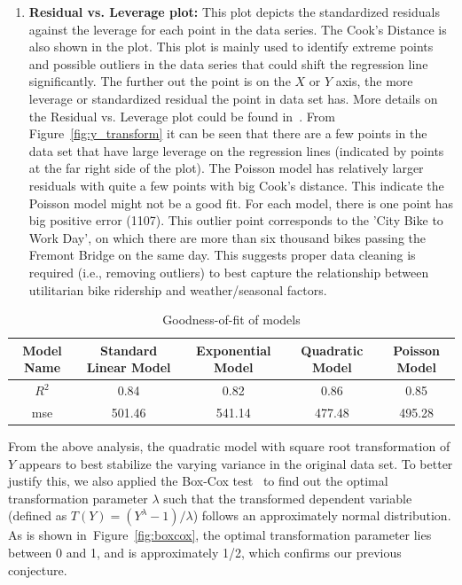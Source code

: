 \documentclass [11pt, proquest] {uwthesis}[2015/03/03]
\begin{document}
\begin{enumerate}
\item \textbf{Residual vs. Leverage plot:} This plot depicts the standardized residuals against the leverage for each point in the data series. The Cook's Distance is also shown in the plot. This plot is mainly used to identify extreme points and possible outliers in the data series that could shift the regression line significantly. The further out the point is on the $X$ or $Y$ axis, the more leverage or standardized residual the point in data set has. More details on the Residual vs. Leverage plot could be found in~\cite{gung13}. From Figure~\ref{fig:y_transform} it can be seen that there are a few points in the data set that have large leverage on the regression lines (indicated by points at the far right side of the plot). The Poisson model has relatively larger residuals with quite a few points with big Cook's distance. This indicate the Poisson model might not be a good fit. For each model, there is one point has big positive error (1107). This outlier point corresponds to the 'City Bike to Work Day', on which there are more than six thousand bikes passing the Fremont Bridge on the same day. This suggests proper data cleaning is required (i.e., removing outliers) to best capture the relationship between utilitarian bike ridership and weather/seasonal factors. 
\end{enumerate}

\begin{table}
\caption{Goodness-of-fit of models} 
  \label{tbl:ytransform} 
\small
\begin{tabular}{ c | c | c | c | c } 
\hline 
  Model Name & Standard Linear Model & Exponential Model & Quadratic Model & Poisson Model \\ 
\hline
  $R^2$  & 0.84 & 0.82 & 0.86 & 0.85 \\ 
  mse  & 501.46 & 541.14 & 477.48 & 495.28 \\ 
\hline 
\end{tabular} 
\end{table} 

From the above analysis, the quadratic model with square root transformation of $Y$ appears to best stabilize the varying variance in the original data set. To better justify this, we also applied the Box-Cox test~\cite{boxcox64} to find out the optimal transformation parameter $\lambda$ such that the transformed dependent variable (defined as $T(Y) = (Y^{\lambda}-1)/\lambda$) follows an approximately normal distribution. As is shown in~Figure~\ref{fig:boxcox}, the optimal transformation parameter lies between 0 and 1, and is approximately 1/2, which confirms our previous conjecture.
\end{document}
